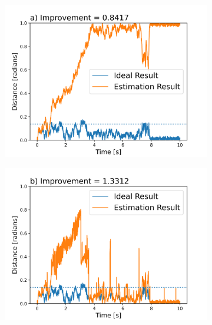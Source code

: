 \documentclass[final, 3p]{elsarticle}
\begin{document}
\begin{figure}[h]
	
	\centering
	\begin{subfigure}{0.49\textwidth}
		\includegraphics[width=\textwidth]{./Images/epsilon_5.png}
	\end{subfigure}
	\begin{subfigure}{0.49\textwidth}
		\includegraphics[width=\textwidth]{./Images/epsilon_15.png}
	\end{subfigure}
	\begin{subfigure}{0.5\textwidth}

\end{subfigure}
\end{figure}
\end{document}
